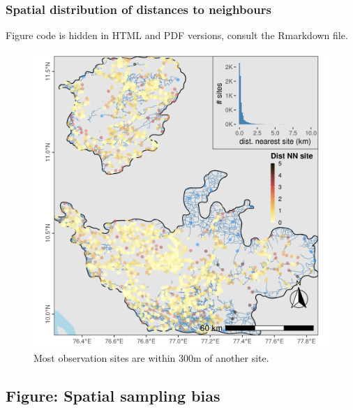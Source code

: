 \documentclass[
]{article}
\newenvironment{Shaded}{}{}
\newcommand{\CommentTok}[1]{\textcolor[rgb]{0.00,0.50,0.00}{#1}}
\newcommand{\DataTypeTok}[1]{#1}
\newcommand{\DecValTok}[1]{#1}
\newcommand{\KeywordTok}[1]{\textcolor[rgb]{0.00,0.00,1.00}{#1}}
\newcommand{\NormalTok}[1]{#1}
\newcommand{\OperatorTok}[1]{#1}
\newcommand{\StringTok}[1]{\textcolor[rgb]{0.00,0.50,0.50}{#1}}
\begin{document}
\hypertarget{spatial-distribution-of-distances-to-neighbours}{%
\subsubsection{Spatial distribution of distances to neighbours}\label{spatial-distribution-of-distances-to-neighbours}}

Figure code is hidden in HTML and PDF versions, consult the Rmarkdown file.

\begin{figure}
\centering
\includegraphics{figs/fig_site_nnb.png}
\caption{Most observation sites are within 300m of another site.}
\end{figure}

\hypertarget{figure-spatial-sampling-bias}{%
\subsection{Figure: Spatial sampling bias}\label{figure-spatial-sampling-bias}}

\begin{Shaded}
\end{Shaded}
\end{document}
